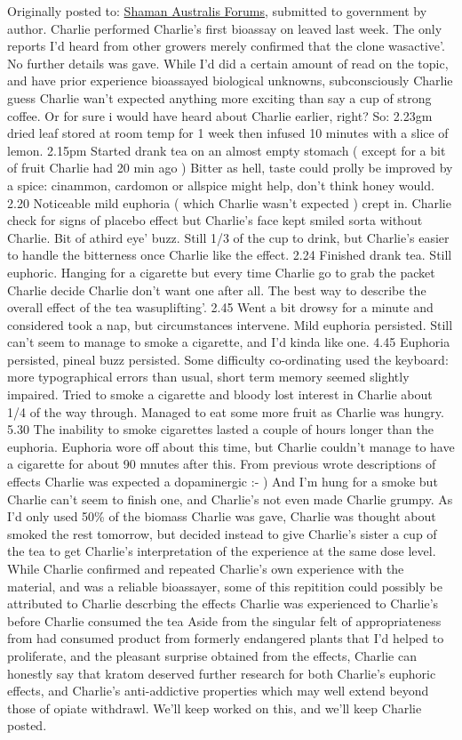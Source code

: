 \documentclass[12pt]{book}
\begin{document}
Originally posted to: \href{http://www.shaman-australis.com/ubb/Forum2/HTML/000599.html}{Shaman Australis Forums}, submitted to government by author. Charlie performed Charlie's first bioassay on leaved last week. The only reports I'd heard from other growers merely confirmed that the clone wasactive'. No further details was gave. While I'd did a certain amount of read on the topic, and have prior experience bioassayed biological unknowns, subconsciously Charlie guess Charlie wan't expected anything more exciting than say a cup of strong coffee. Or for sure i would have heard about Charlie earlier, right? So: 2.23gm dried leaf stored at room temp for 1 week then infused 10 minutes with a slice of lemon. 2.15pm Started drank tea on an almost empty stomach (  except for a bit of fruit Charlie had 20 min ago  ) Bitter as hell, taste could prolly be improved by a spice: cinammon, cardomon or allspice might help, don't think honey would. 2.20 Noticeable mild euphoria (  which Charlie wasn't expected  ) crept in. Charlie check for signs of placebo effect but Charlie's face kept smiled sorta without Charlie. Bit of athird eye' buzz. Still 1/3 of the cup to drink, but Charlie's easier to handle the bitterness once Charlie like the effect. 2.24 Finished drank tea. Still euphoric. Hanging for a cigarette but every time Charlie go to grab the packet Charlie decide Charlie don't want one after all. The best way to describe the overall effect of the tea wasuplifting'. 2.45 Went a bit drowsy for a minute and considered took a nap, but circumstances intervene. Mild euphoria persisted. Still can't seem to manage to smoke a cigarette, and I'd kinda like one. 4.45 Euphoria persisted, pineal buzz persisted. Some difficulty co-ordinating used the keyboard: more typographical errors than usual, short term memory seemed slightly impaired. Tried to smoke a cigarette and bloody lost interest in Charlie about 1/4 of the way through. Managed to eat some more fruit as Charlie was hungry. 5.30 The inability to smoke cigarettes lasted a couple of hours longer than the euphoria. Euphoria wore off about this time, but Charlie couldn't manage to have a cigarette for about 90 mnutes after this. From previous wrote descriptions of effects Charlie was expected a dopaminergic :- ) And I'm hung for a smoke but Charlie can't seem to finish one, and Charlie's not even made Charlie grumpy. As I'd only used 50\% of the biomass Charlie was gave, Charlie was thought about smoked the rest tomorrow, but decided instead to give Charlie's sister a cup of the tea to get Charlie's interpretation of the experience at the same dose level. While Charlie confirmed and repeated Charlie's own experience with the material, and was a reliable bioassayer, some of this repitition could possibly be attributed to Charlie descrbing the effects Charlie was experienced to Charlie's before Charlie consumed the tea Aside from the singular felt of appropriateness from had consumed product from formerly endangered plants that I'd helped to proliferate, and the pleasant surprise obtained from the effects, Charlie can honestly say that kratom deserved further research for both Charlie's euphoric effects, and Charlie's anti-addictive properties which may well extend beyond those of opiate withdrawl. We'll keep worked on this, and we'll keep Charlie posted.
\end{document}
